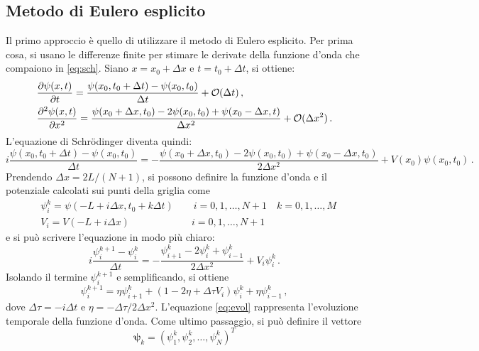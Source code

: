 \documentclass[a4paper, titlepage]{article}
\numberwithin{equation}{section}
\begin{document}
\subsection{Metodo di Eulero esplicito}
Il primo approccio è quello di utilizzare il metodo di Eulero esplicito. 
Per prima cosa, si usano le differenze finite per stimare le derivate della funzione d'onda che compaiono in \eqref{eq:sch}. Siano $x = x_0 + \Delta x$ e $t = t_0 + \Delta t$, si ottiene:
\begin{align*}
    &\pdv{\psi(x, t)}{t} = \frac{\psi(x_0, t_0 + \Delta t) - \psi(x_0, t_0)}{\Delta t} + \mathcal{O}(\Delta t)\, , \\
    &\pdv[2]{\psi(x, t)}{x} = \frac{\psi(x_0 + \Delta x, t_0) - 2\psi(x_0, t_0) + \psi(x_0 - \Delta x, t)}{\Delta x^2} + \mathcal{O}(\Delta x^2)\, .
\end{align*}
L'equazione di Schrödinger diventa quindi:
\begin{equation*}
    i \frac{\psi(x_0, t_0 + \Delta t) - \psi(x_0, t_0)}{\Delta t} = 
    - \frac{\psi(x_0 + \Delta x, t_0) - 2\psi(x_0, t_0) + \psi(x_0 - \Delta x, t_0)}{2\Delta x^2} + V(x_0)\psi(x_0, t_0)\, .
\end{equation*}
Prendendo $\Delta x = 2L/(N+1)$, si possono definire la funzione d'onda e il potenziale calcolati sui punti della griglia come
\begin{align*}
    &\psi_i^k = \psi(-L + i\Delta x, t_0 + k\Delta t) \qquad i = 0,1,\dots,N+1 \quad k = 0,1,\dots,M \\
    &V_i = V(-L + i\Delta x) \qquad\qquad\qquad\ i = 0,1,\dots,N+1
\end{align*}
e si può scrivere l'equazione in modo più chiaro:
\begin{equation*}
    i \frac{\psi_i^{k+1} - \psi_i^k}{\Delta t} = 
    - \frac{\psi_{i+1}^k - 2\psi_i^k + \psi_{i-1}^k}{2\Delta x^2} + V_i\psi_i^k\, .
\end{equation*}
Isolando il termine $\psi_i^{k+1}$ e semplificando, si ottiene
\begin{equation}
    \psi_i^{k+1} = \eta \psi_{i+1}^k + (1 - 2\eta + \Delta\tau V_i)\psi_i^k + \eta\psi_{i-1}^k\, ,
    \label{eq:evol}
\end{equation}
dove $\Delta\tau = -i\Delta t$ e $\eta = - \Delta\tau/2\Delta x^2$. L'equazione \eqref{eq:evol} rappresenta l'evoluzione temporale della funzione d'onda. Come ultimo passaggio, si può definire il vettore
\begin{equation*}
    \bm{\psi}_k = (\psi_1^k,\psi_2^k,\dots,\psi_N^k)^T
\end{equation*}
\end{document}
